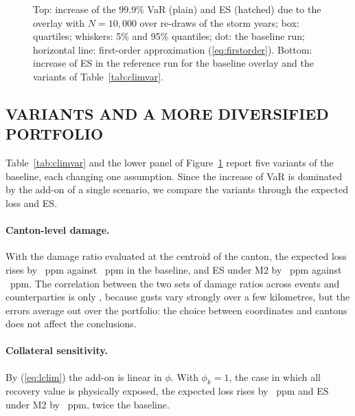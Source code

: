 \begin{figure}[tb]
\centering
{}
\caption{Top: increase of the $99.9\%$ VaR (plain) and ES (hatched) due to the overlay with $N=10{,}000$ over  re-draws of the storm years; box: quartiles; whiskers: 5\% and 95\% quantiles; dot: the baseline run; horizontal line: first-order approximation (\ref{eq:firstorder}). Bottom: increase of ES in the reference run for the baseline overlay and the variants of Table~\ref{tab:climvar}.}
\label{fig:climeff}
\end{figure}

\subsection{VARIANTS AND A MORE DIVERSIFIED PORTFOLIO}
\label{subsec:climvariants}
\begin{table}[tb]
\caption{Reference run ($N=2{,}000{,}000$): increase of the expected loss (under M2), VaR and ES due to the storm overlay, in parts per million, for the baseline design and five variants. First row: first-order approximation (\ref{eq:firstorder}) for the baseline. The VaR columns are dominated by the add-on of a single scenario; ES is the reliable measure.}
\label{tab:climvar}
\centering
{}
\end{table}

Table~\ref{tab:climvar} and the lower panel of Figure~\ref{fig:climeff} report five variants of the baseline, each changing one assumption. Since the increase of VaR is dominated by the add-on of a single scenario, we compare the variants through the expected loss and ES.

\paragraph{Canton-level damage.}
With the damage ratio evaluated at the centroid of the canton, the expected loss rises by ~ppm against ~ppm in the baseline, and ES under M2 by ~ppm against ~ppm. The correlation between the two sets of damage ratios across events and counterparties is only , because gusts vary strongly over a few kilometres, but the errors average out over the portfolio: the choice between coordinates and cantons does not affect the conclusions.

\paragraph{Collateral sensitivity.}
By (\ref{eq:lclim}) the add-on is linear in $\phi$. With $\phi_k=1$, the case in which all recovery value is physically exposed, the expected loss rises by ~ppm and ES under M2 by ~ppm, twice the baseline.

